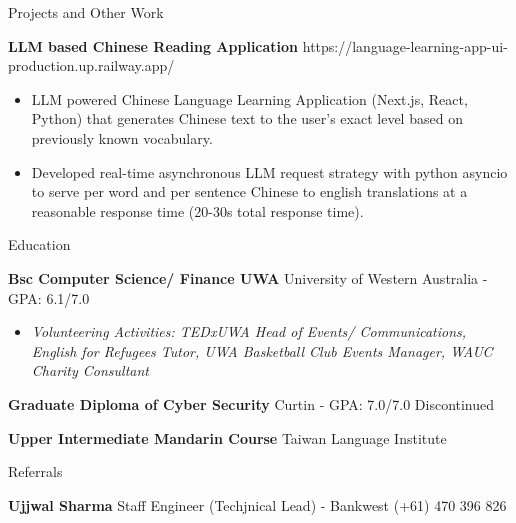 \documentclass{resume} %
\begin{document}
	\begin{rSection}{Projects and Other Work}
		\vspace{-0.8em}
		\item \textbf{LLM based Chinese Reading Application} {\hfill {} https://language-learning-app-ui-production.up.railway.app/}  
		\begin{itemize} 
			\item LLM powered Chinese Language Learning Application (Next.js, React, Python) that generates Chinese text to the user's exact level based on previously known vocabulary.
			\item Developed real-time asynchronous LLM request strategy with python asyncio to serve per word and per sentence Chinese to english translations at a reasonable response time (20-30s total response time). 
		\end{itemize}
	\end{rSection} 
	
	\begin{rSection}{Education}
		\vspace{-0.8em}
		\item \textbf{Bsc Computer Science/ Finance UWA} {University of Western Australia} - GPA: 6.1/7.0 \hfill 
		\begin{itemize} 
			\scriptsize\item \textit{Volunteering Activities: TEDxUWA Head of Events/ Communications, English for Refugees Tutor, UWA Basketball Club Events Manager, WAUC Charity Consultant} \hfill
		\end{itemize}
		\item \textbf{Graduate Diploma of Cyber Security} {Curtin} - GPA: 7.0/7.0 \hfill Discontinued
		\item \textbf{Upper Intermediate Mandarin Course} {Taiwan Language Institute}\hfill 
	\end{rSection} 

	\begin{rSection}{Referrals} 
		\vspace{-0.8em}
		\item \textbf{Ujjwal Sharma} {Staff Engineer (Techjnical Lead) - Bankwest} 
			\hfill 
			 (+61) 470 396 826
	\end{rSection}
\end{document}
